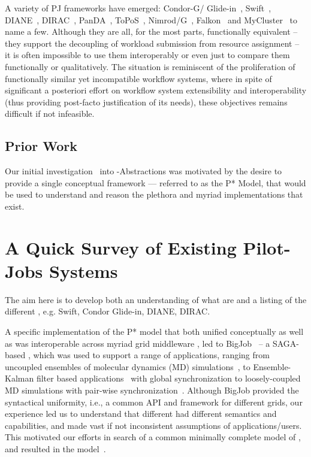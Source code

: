\documentclass{sig-alternate}
\begin{document}
A variety of PJ frameworks have emerged: Condor-G/
Glide-in~\cite{condor-g}, Swift~\cite{Wilde2011},
DIANE~\cite{Moscicki:908910}, DIRAC~\cite{1742-6596-219-6-062049},
PanDA~\cite{1742-6596-219-6-062041}, ToPoS~\cite{topos},
Nimrod/G~\cite{10.1109/HPC.2000.846563}, Falkon~\cite{1362680} and
MyCluster~\cite{1652061} to name a few. Although they are all, for the
most parts, functionally equivalent -- they support the decoupling of
workload submission from resource assignment -- it is often impossible
to use them interoperably or even just to compare them functionally or
qualitatively.  The situation is reminiscent of the proliferation of
functionally similar yet incompatible workflow systems, where in spite
of significant a posteriori effort on workflow system extensibility
and interoperability (thus providing post-facto justification of its
needs), these objectives remains difficult if not infeasible.



\subsection{Prior Work}

Our initial investigation~\cite{Luckow:2008la} into
\pilot-Abstractions was motivated by the desire to provide a single
conceptual framework --- referred to as the P* Model, that would be
used to understand and reason the plethora and myriad \pilotjob
implementations that exist.



\section{A  Quick Survey of Existing Pilot-Jobs Systems}

The aim here is to develop both an understanding of what \pilotjobs
are and a listing of the different \pilotjobs, e.g. Swift, Condor
Glide-in, DIANE, DIRAC.


A specific implementation of the P* model that both unified
conceptually as well as was interoperable across myriad grid
middleware , led to 
BigJob~\cite{saga_bigjob_condor_cloud} -- a
SAGA-based \pilotjob, which was used to support a range of
applications, ranging from uncoupled ensembles of molecular dynamics
(MD) simulations~\cite{saga_bigjob_condor_cloud}, to Ensemble-Kalman
filter based applications~\cite{gmac09} with global synchronization to
loosely-coupled MD simulations with pair-wise
synchronization~\cite{async_repex11}.  Although BigJob provided the
syntactical uniformity, i.e., a common API and framework for different
grids, our experience led us to understand that different \pilotjobs
had different semantics and capabilities, and made vast if not
inconsistent assumptions of applications/users. This motivated our
efforts in search of a common minimally complete model of \pilotjobs,
and resulted in the \pstar model~\cite{pstar12}. 
\end{document}
